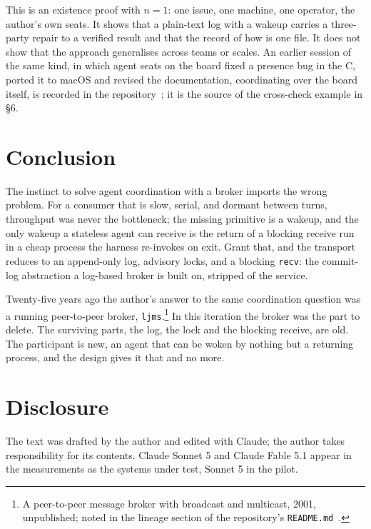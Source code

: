 \documentclass[11pt]{article}
\newcommand{\code}[1]{\texttt{#1}}
\begin{document}
This is an existence proof with $n=1$: one issue, one machine, one operator, the author's own seats. It shows that a plain-text log with a wakeup carries a three-party repair to a verified result and that the record of how is one file. It does not show that the approach generalises across teams or scales. An earlier session of the same kind, in which agent seats on the board fixed a presence bug in the C, ported it to macOS and revised the documentation, coordinating over the board itself, is recorded in the repository~\cite{repo}; it is the source of the cross-check example in \S6.

\section{Conclusion}

The instinct to solve agent coordination with a broker imports the wrong problem. For a consumer that is slow, serial, and dormant between turns, throughput was never the bottleneck; the missing primitive is a wakeup, and the only wakeup a stateless agent can receive is the return of a blocking receive run in a cheap process the harness re-invokes on exit. Grant that, and the transport reduces to an append-only log, advisory locks, and a blocking \code{recv}: the commit-log abstraction a log-based broker is built on, stripped of the service.

Twenty-five years ago the author's answer to the same coordination question was a running peer-to-peer broker, \code{ljms}.\footnote{A peer-to-peer message broker with broadcast and multicast, 2001, unpublished; noted in the lineage section of the repository's \code{README.md}~\cite{repo}.} In this iteration the broker was the part to delete. The surviving parts, the log, the lock and the blocking receive, are old. The participant is new, an agent that can be woken by nothing but a returning process, and the design gives it that and no more.

\section*{Disclosure}

The text was drafted by the author and edited with Claude; the author takes responsibility for its contents. Claude Sonnet 5 and Claude Fable 5.1 appear in the measurements as the systems under test, Sonnet 5 in the pilot.
\end{document}
